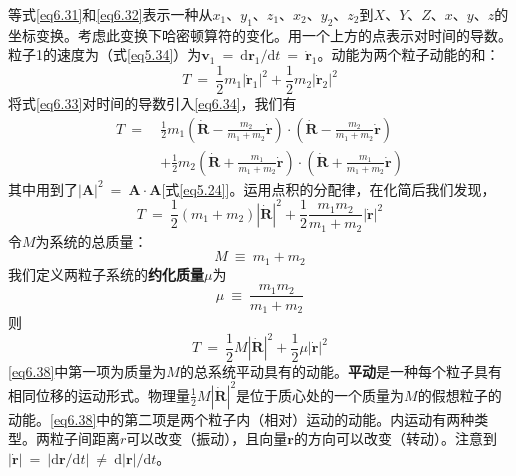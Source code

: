 \documentclass[12pt,a4paper,openany]{ctexbook}
\newcommand{\abs}[1]{\left| #1 \right|}
\newcommand{\dd}[1]{\mathrm{d} #1}
\newcommand{\vv}{\boldsymbol{v}} %
\begin{document}
\begin{flushleft}
等式\eqref{eq6.31}和\eqref{eq6.32}表示一种从$x_1$、$y_1$、$z_1$、$x_2$、$y_2$、$z_2$到$X$、$Y$、$Z$、$x$、$y$、$z$的坐标变换。考虑此变换下哈密顿算符的变化。用一个上方的点表示对时间的导数。粒子1的速度为（式\eqref{eq5.34}）为$\vv_1\ =\ \dd\boldsymbol{r}_1/\dd t\ =\ \dot{\boldsymbol{r}}_1$。动能为两个粒子动能的和：
\begin{equation}
    T\ =\ \frac{1}{2}m_1\abs{\dot{\boldsymbol{r}}_1}^2+\frac{1}{2}m_2\abs{\dot{\boldsymbol{r}}_2}^2 \label{eq6.34}
\end{equation}
将式\eqref{eq6.33}对时间的导数引入\eqref{eq6.34}，我们有
\begin{align*}
    T\ =\ &\frac{1}{2}m_1(\dot{\boldsymbol{R}}-\frac{m_2}{m_1+m_2}\dot{\boldsymbol{r}})\cdot(\dot{\boldsymbol{R}}-\frac{m_2}{m_1+m_2}\dot{\boldsymbol{r}}) \\
    &+\frac{1}{2}m_2(\dot{\boldsymbol{R}}+\frac{m_1}{m_1+m_2}\dot{\boldsymbol{r}})\cdot(\dot{\boldsymbol{R}}+\frac{m_1}{m_1+m_2}\dot{\boldsymbol{r}})
\end{align*}
其中用到了$\abs{\boldsymbol{A}}^2\ =\ \boldsymbol{A}\cdot\boldsymbol{A}$[式\eqref{eq5.24}]。运用点积的分配律，在化简后我们发现，
\begin{equation}
    T\ =\ \frac{1}{2}(m_1+m_2)\abs{\dot{\boldsymbol{R}}}^2+\frac{1}{2}\frac{m_1m_2}{m_1+m_2}\abs{\dot{\boldsymbol{r}}}^2 \label{eq6.35}
\end{equation}
令$M$为系统的总质量：
\begin{equation}
    M\ \equiv\ m_1+m_2 \label{eq6.36}
\end{equation}
我们定义两粒子系统的\textbf{约化质量}$\mu$为
\begin{equation}
    \boxed{\mu\ \equiv\ \frac{m_1m_2}{m_1+m_2}} \label{eq6.37}
\end{equation}
则
\begin{equation}
    T\ =\ \frac{1}{2}M\abs{\dot{\boldsymbol{R}}}^2+\frac{1}{2}\mu\abs{\dot{\boldsymbol{r}}}^2 \label{eq6.38}
\end{equation}
\eqref{eq6.38}中第一项为质量为$M$的总系统平动具有的动能。\textbf{平动}是一种每个粒子具有相同位移的运动形式。物理量$\frac{1}{2}M\abs{\dot{\boldsymbol{R}}}^2$是位于质心处的一个质量为$M$的假想粒子的动能。\eqref{eq6.38}中的第二项是两个粒子内（相对）运动的动能。内运动有两种类型。两粒子间距离$r$可以改变（振动），且向量$\boldsymbol{r}$的方向可以改变（转动）。注意到$\abs{\dot{\boldsymbol{r}}}\ =\ \abs{\dd\boldsymbol{r}/\dd t}\ \neq\ \dd\abs{\boldsymbol{r}}/\dd t$。


\end{flushleft}
\end{document}
